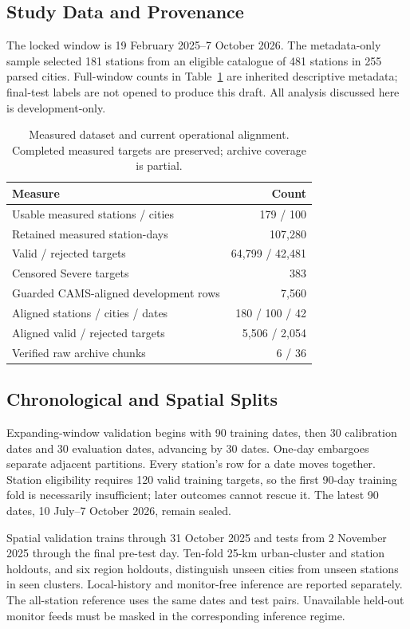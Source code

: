 \documentclass[journal]{IEEEtran}
\begin{document}
\subsection{Study Data and Provenance}
The locked window is 19 February 2025--7 October 2026. The metadata-only
sample selected 181 stations from an eligible catalogue of 481 stations in
255 parsed cities. Full-window counts in Table~\ref{tab:data} are inherited
descriptive metadata; final-test labels are not opened to produce this draft.
All analysis discussed here is development-only.
\begin{table}[t]\centering\footnotesize
\caption{Measured dataset and current operational alignment. Completed measured targets are preserved; archive coverage is partial.}
\label{tab:data}
\setlength{\tabcolsep}{4pt}
\begin{tabular}{lr}
\toprule
Measure & Count\\\midrule
Usable measured stations / cities & 179 / 100\\
Retained measured station-days & 107,280\\
Valid / rejected targets & 64,799 / 42,481\\
Censored Severe targets & 383\\
Guarded CAMS-aligned development rows & 7,560\\
Aligned stations / cities / dates & 180 / 100 / 42\\
Aligned valid / rejected targets & 5,506 / 2,054\\
Verified raw archive chunks & 6 / 36\\
\bottomrule\end{tabular}
\end{table}
\subsection{Chronological and Spatial Splits}
Expanding-window validation begins with 90 training dates, then 30 calibration
dates and 30 evaluation dates, advancing by 30 dates. One-day embargoes
separate adjacent partitions. Every station's row for a date moves together.
Station eligibility requires 120 valid training targets, so the first 90-day
training fold is necessarily insufficient; later outcomes cannot rescue it.
The latest 90 dates, 10 July--7 October 2026, remain sealed.

Spatial validation trains through 31 October 2025 and tests from 2 November
2025 through the final pre-test day. Ten-fold 25-km urban-cluster and station
holdouts, and six region holdouts, distinguish unseen cities from unseen
stations in seen clusters. Local-history and monitor-free inference are
reported separately. The all-station reference uses the same dates and test
pairs. Unavailable held-out monitor feeds must be masked in the corresponding
inference regime.
\end{document}
